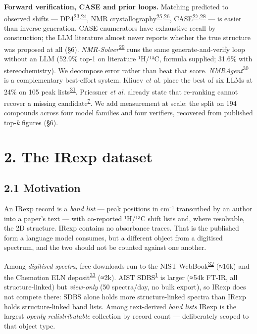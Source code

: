 \documentclass[
  10pt,
]{article}
\begin{document}
\textbf{Forward verification, CASE and prior loops.} Matching predicted
to observed shifts ---
DP4\textsuperscript{\protect\hyperlink{ref-smith2010dp4}{23},\protect\hyperlink{ref-grimblat2015dp4plus}{24}},
NMR
crystallography\textsuperscript{\protect\hyperlink{ref-pickard2001gipaw}{25},\protect\hyperlink{ref-ashbrook2016nmrcryst}{26}},
CASE\textsuperscript{\protect\hyperlink{ref-elyashberg2012case}{27},\protect\hyperlink{ref-elyashberg2015case}{28}}
--- is easier than inverse generation. CASE enumerators have exhaustive
recall by construction; the LLM literature almost never reports whether
the true structure was proposed at all (§6).
\emph{NMR-Solver}\textsuperscript{\protect\hyperlink{ref-jin2025nmrsolver}{29}}
runs the same generate-and-verify loop without an LLM (52.9\% top-1 on
literature ¹H/¹³C, formula supplied; 31.6\% with stereochemistry). We
decompose error rather than beat that score.
\emph{NMRAgent}\textsuperscript{\protect\hyperlink{ref-fang2026nmragent}{30}}
is a complementary best-effort system. Kliuev \emph{et al.} place the
best of six LLMs at 24\% on 105 peak
lists\textsuperscript{\protect\hyperlink{ref-kliuev2026canai}{31}}.
Priessner \emph{et al.} already state that re-ranking cannot recover a
missing
candidate\textsuperscript{\protect\hyperlink{ref-priessner2026reasoning}{7}}.
We add measurement at scale: the split on 194 compounds across four
model families and four verifiers, recovered from published top-\emph{k}
figures (§6).

\hypertarget{the-irexp-dataset}{%
\section{2. The IRexp dataset}\label{the-irexp-dataset}}

\hypertarget{motivation}{%
\subsection{2.1 Motivation}\label{motivation}}

An IRexp record is a \emph{band list} --- peak positions in cm⁻¹
transcribed by an author into a paper's text --- with co-reported ¹H/¹³C
shift lists and, where resolvable, the 2D structure. IRexp contains no
absorbance traces. That is the published form a language model consumes,
but a different object from a digitised spectrum, and the two should not
be counted against one another.

Among \emph{digitised spectra}, free downloads run to the NIST
WebBook\textsuperscript{\protect\hyperlink{ref-nist_webbook}{32}} (≈16k)
and the Chemotion ELN
deposit\textsuperscript{\protect\hyperlink{ref-chemotion2024}{33}}
(≈2k). AIST SDBS\textsuperscript{\protect\hyperlink{ref-sdbs}{1}} is
larger (≈54k FT-IR, all structure-linked) but \emph{view-only} (50
spectra/day, no bulk export), so IRexp does not compete there: SDBS
alone holds more structure-linked spectra than IRexp holds
structure-linked band lists. Among text-derived \emph{band lists} IRexp
is the largest \emph{openly redistributable} collection by record count
--- deliberately scoped to that object type.
\end{document}
